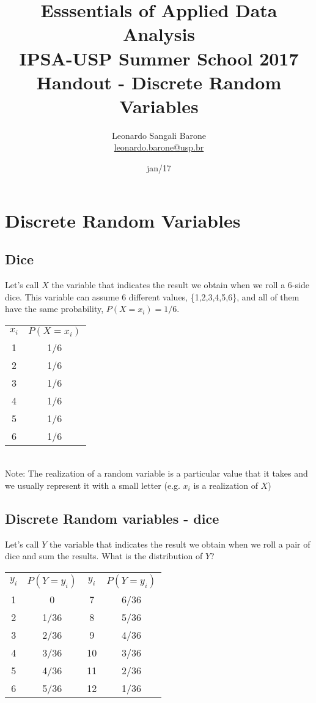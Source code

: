 \documentclass[11pt]{article}
\title{\textbf{Esssentials of Applied Data Analysis\\
				IPSA-USP Summer School 2017}\newline\\
				Handout - Discrete Random Variables}
\author{Leonardo Sangali Barone\\ \href{leonardo.barone@usp.br}{leonardo.barone@usp.br}}
\date{jan/17}
\begin{document}
\maketitle

\section*{Discrete Random Variables}

	\subsection*{Dice}
	
	Let's call $X$ the variable that indicates the result we obtain when we roll a 6-side dice. This variable can assume 6 different values, \{1,2,3,4,5,6\}, and all of them have the same probability, $P(X=x_i) = 1/6$.\newline\\
	\begin{tabular}{|c|c|}
\hline
	$x_i$ & $P(X=x_i)$\\
	\cline{1-2}
	1 & 1/6\\
	2 & 1/6\\
	3 & 1/6\\
	4 & 1/6\\
	5 & 1/6\\
	6 & 1/6\\

\hline
\end{tabular}\\

Note: The realization of a random variable is a particular value that it takes and we usually represent it with a small letter (e.g. $x_i$ is a realization of $X$)


	\subsection*{Discrete Random variables - dice}
	Let's call $Y$ the variable that indicates the result we obtain when we roll a pair of dice and sum the results. What is the distribution of $Y$?\\
	
	\begin{tabular}{|c|c|c|c|}
\hline
	$y_i$ & $P(Y=y_i)$ & $y_i$ & $P(Y=y_i)$\\
	\cline{1-4}
	1 & 0 & 7 & 6/36\\
	2 & 1/36 & 8 & 5/36\\
	3 & 2/36 & 9 & 4/36\\
	4 & 3/36 & 10 & 3/36\\
	5 & 4/36 & 11 & 2/36\\
	6 & 5/36 & 12 & 1/36\\
\hline
\end{tabular}\\
\end{document}
